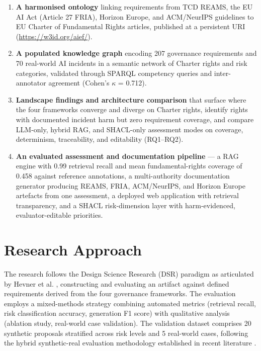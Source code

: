\begin{enumerate}
\item \textbf{A harmonised ontology} linking requirements from TCD REAMS, the EU AI Act (Article 27 FRIA), Horizon Europe, and ACM/NeurIPS guidelines to EU Charter of Fundamental Rights articles, published at a persistent URI (\url{https://w3id.org/aief/}).

\item \textbf{A populated knowledge graph} encoding 207 governance requirements and 70 real-world AI incidents in a semantic network of Charter rights and risk categories, validated through SPARQL competency queries and inter-annotator agreement (Cohen's $\kappa$ = 0.712).

\item \textbf{Landscape findings and architecture comparison} that surface where the four frameworks converge and diverge on Charter rights, identify rights with documented incident harm but zero requirement coverage, and compare LLM-only, hybrid RAG, and SHACL-only assessment modes on coverage, determinism, traceability, and editability (RQ1--RQ2).

\item \textbf{An evaluated assessment and documentation pipeline} --- a RAG engine with 0.99 retrieval recall and mean fundamental-rights coverage of 0.458 against reference annotations, a multi-authority documentation generator producing REAMS, FRIA, ACM/NeurIPS, and Horizon Europe artefacts from one assessment, a deployed web application with retrieval transparency, and a SHACL risk-dimension layer with harm-evidenced, evaluator-editable priorities.
\end{enumerate}


\section{Research Approach}

The research follows the Design Science Research (DSR) paradigm as articulated by Hevner et al. \cite{hevner2004}, constructing and evaluating an artifact against defined requirements derived from the four governance frameworks. The evaluation employs a mixed-methods strategy combining automated metrics (retrieval recall, risk classification accuracy, generation F1 score) with qualitative analysis (ablation study, real-world case validation). The validation dataset comprises 20 synthetic proposals stratified across risk levels and 5 real-world cases, following the hybrid synthetic-real evaluation methodology established in recent literature \cite{pasta2026, invisiblebench2025, autocontrolarena2025}.


